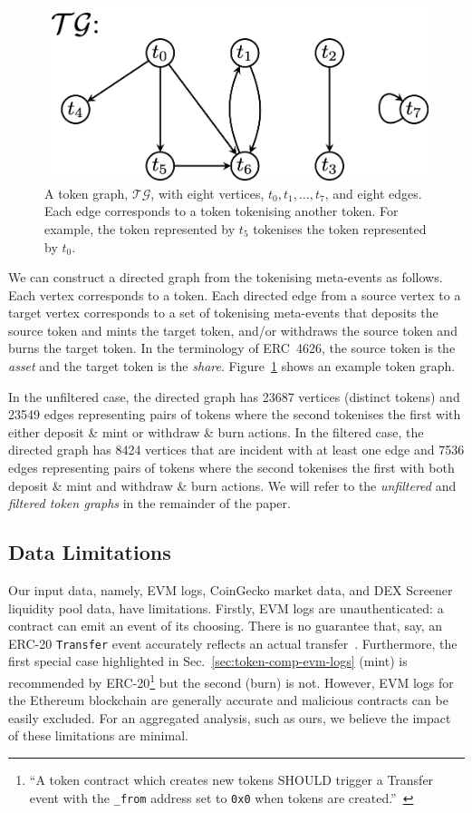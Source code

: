 \begin{figure}
  \centerline{\includegraphics[width=0.75\columnwidth]{img/token-graph/token-graph.png}}
  \caption{A token graph, $\mathcal{TG}$, with eight vertices, $t_0,
    t_1, \ldots, t_7$, and eight edges.  Each edge corresponds to a
    token tokenising another token.  For example, the token
    represented by $t_5$ tokenises the token represented by
    $t_0$.}\label{fig:token-graph}
\end{figure}

We can construct a directed graph from the tokenising meta-events as
follows.  Each vertex corresponds to a token.  Each directed edge from
a source vertex to a target vertex corresponds to a set of tokenising
meta-events that deposits the source token and mints the target token,
and/or withdraws the source token and burns the target token.  In the
terminology of ERC~4626, the source token is the \textit{asset} and
the target token is the \textit{share}.  Figure~\ref{fig:token-graph}
shows an example token graph.

In the unfiltered case, the directed graph has \num{23687} vertices
(distinct tokens) and \num{23549} edges representing pairs of tokens
where the second tokenises the first with either deposit \& mint or
withdraw \& burn actions.  In the filtered case, the directed graph
has \num{8424} vertices that are incident with at least one edge and
\num{7536} edges representing pairs of tokens where the second
tokenises the first with both deposit \& mint and withdraw \& burn
actions.  We will refer to the \textit{unfiltered} and
\textit{filtered token graphs} in the remainder of the paper.

\subsection{Data Limitations}\label{sec:token-comp-limitations}

Our input data, namely, EVM logs, CoinGecko market data, and DEX
Screener liquidity pool data, have limitations.  Firstly, EVM logs are
unauthenticated: a contract can emit an event of its choosing.  There
is no guarantee that, say, an ERC-20 \texttt{Transfer} event
accurately reflects an actual transfer~\cite{guidi-michienzi-22}.
Furthermore, the first special case highlighted in
Sec.~\ref{sec:token-comp-evm-logs} (mint) is recommended by
ERC-20\footnote{``A token contract which creates new tokens SHOULD
trigger a Transfer event with the \texttt{\_from} address set to
\texttt{0x0} when tokens are
created.''~\cite{vogelsteller-buterin-15}} but the second (burn) is
not.  However, EVM logs for the Ethereum blockchain are generally
accurate and malicious contracts can be easily excluded.  For an
aggregated analysis, such as ours, we believe the impact of these
limitations are minimal.

